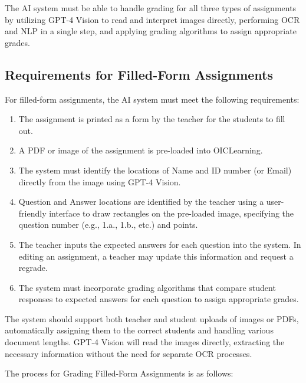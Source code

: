 \documentclass[ms,twoside,print]{nuthesis}
\begin{document}
The AI system must be able to handle grading for all three types of assignments by utilizing GPT-4 Vision to read and interpret images directly, performing OCR and NLP in a single step, and applying grading algorithms to assign appropriate grades.

\subsection{Requirements for Filled-Form Assignments}

For filled-form assignments, the AI system must meet the following requirements:


\begin{enumerate}
    \item The assignment is printed as a form by the teacher for the students to fill out.
    \item A PDF or image of the assignment is pre-loaded into OICLearning.
    \item The system must identify the locations of Name and ID number (or Email) directly from the image using GPT-4 Vision.
    \item Question and Answer locations are identified by the teacher using a user-friendly interface to draw rectangles on the pre-loaded image, specifying the question number (e.g., 1.a., 1.b., etc.) and points.
    \item The teacher inputs the expected answers for each question into the system. In editing an assignment, a teacher may update this information and request a regrade. 
    \item The system must incorporate grading algorithms that compare student responses to expected answers for each question to assign appropriate grades.
\end{enumerate}

The system should support both teacher and student uploads of images or PDFs, automatically assigning them to the correct students and handling various document lengths. GPT-4 Vision will read the images directly, extracting the necessary information without the need for separate OCR processes.

The process for Grading Filled-Form Assignments is as follows:
\end{document}
